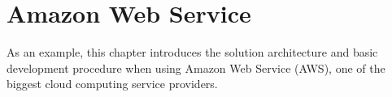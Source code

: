 \chapter{Amazon Web Service}

As an example, this chapter introduces the solution architecture and basic development procedure when using Amazon Web Service (AWS), one of the biggest cloud computing service providers.